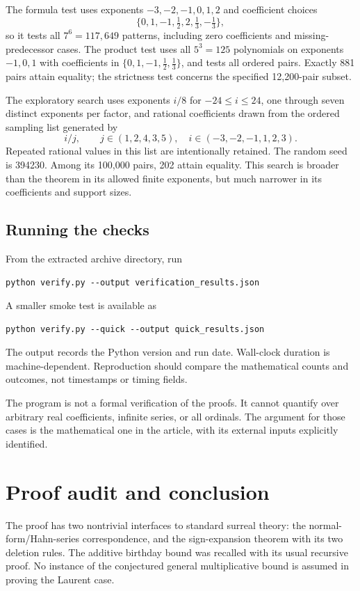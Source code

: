\documentclass[11pt,letterpaper]{article}
\numberwithin{equation}{section}
\theoremstyle{definition}
\theoremstyle{remark}
\begin{document}
The formula test uses exponents $-3,-2,-1,0,1,2$ and coefficient choices
\[
 \{0,1,-1,\tfrac12,2,\tfrac13,-\tfrac13\},
\]
so it tests all $7^6=117{,}649$ patterns, including zero coefficients and
missing-predecessor cases. The product test uses all $5^3=125$ polynomials on
exponents $-1,0,1$ with coefficients in
$\{0,1,-1,\tfrac12,\tfrac13\}$, and tests all ordered pairs. Exactly 881 pairs
attain equality; the strictness test concerns the specified 12,200-pair subset.

The exploratory search uses exponents $i/8$ for $-24\leq i\leq24$, one through
seven distinct exponents per factor, and rational coefficients drawn from the
ordered sampling list generated by
\[
 i/j,\qquad j\in(1,2,4,3,5),\quad i\in(-3,-2,-1,1,2,3).
\]
Repeated rational values in this list are intentionally retained. The random
seed is 394230. Among its 100,000 pairs, 202 attain equality. This search is
broader than the theorem in its allowed finite exponents, but much narrower
in its coefficients and support sizes.

\subsection{Running the checks}
From the extracted archive directory, run
\begin{verbatim}
python verify.py --output verification_results.json
\end{verbatim}
A smaller smoke test is available as
\begin{verbatim}
python verify.py --quick --output quick_results.json
\end{verbatim}
The output records the Python version and run date. Wall-clock duration is
machine-dependent. Reproduction should compare the mathematical counts and
outcomes, not timestamps or timing fields.

The program is not a formal verification of the proofs. It cannot quantify
over arbitrary real coefficients, infinite series, or all ordinals. The
argument for those cases is the mathematical one in the article, with its
external inputs explicitly identified.

\section{Proof audit and conclusion}
\label{sec:audit}
The proof has two nontrivial interfaces to standard surreal theory: the
normal-form/Hahn-series correspondence, and the sign-expansion theorem with
its two deletion rules. The additive birthday bound was recalled with its
usual recursive proof. No instance of the conjectured general multiplicative
bound is assumed in proving the Laurent case.
\end{document}
